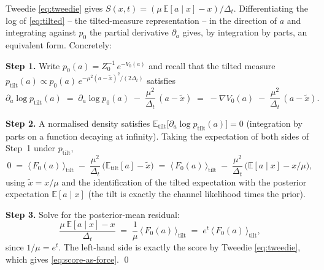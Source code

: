 \documentclass[11pt]{article}
\theoremstyle{definition}
\newcommand{\E}{\mathbb{E}}
\newcommand{\Detl}{\Delta_t}
\begin{document}
\begin{derivation}
Tweedie \eqref{eq:tweedie} gives
\(S(x, t) = (\mu\,\E[a \mid x] - x) / \Detl\). Differentiating the
log of \eqref{eq:tilted} -- the tilted-measure representation -- in
the direction of \(a\) and integrating against \(p_0\) the partial
derivative \(\partial_a\) gives, by integration by parts, an
equivalent form. Concretely:

\textbf{Step 1.} Write \(p_0(a) = Z_0^{-1}\, e^{-V_0(a)}\) and recall
that the tilted measure
\(p_{\mathrm{tilt}}(a) \propto p_0(a)\, e^{-\mu^2 (a - \widetilde x)^2
/ (2 \Detl)}\) satisfies
\begin{equation}
    \partial_a \log p_{\mathrm{tilt}}(a)
    \;=\; \partial_a \log p_0(a)
        \;-\; \frac{\mu^2}{\Detl}\, (a - \widetilde x)
    \;=\; - \nabla V_0(a) \;-\; \frac{\mu^2}{\Detl}\, (a - \widetilde x).
\end{equation}

\textbf{Step 2.} A normalised density satisfies
\(\E_{\mathrm{tilt}}\!\bigl[\partial_a \log p_{\mathrm{tilt}}(a)\bigr] = 0\)
(integration by parts on a function decaying at infinity). Taking the
expectation of both sides of Step~1 under \(p_{\mathrm{tilt}}\),
\begin{equation}
    0 \;=\;
    \bigl\langle\, F_0(a) \,\bigr\rangle_{\!\text{tilt}}
    \;-\;
    \frac{\mu^2}{\Detl}\,
        \bigl(\E_{\mathrm{tilt}}[a] - \widetilde x\bigr)
    \;=\;
    \bigl\langle\, F_0(a) \,\bigr\rangle_{\!\text{tilt}}
    \;-\;
    \frac{\mu^2}{\Detl}\,
        \bigl(\E[a \mid x] - x/\mu\bigr),
\end{equation}
using \(\widetilde x = x / \mu\) and the identification of the tilted
expectation with the posterior expectation
\(\E[a \mid x]\) (the tilt is exactly the channel likelihood times
the prior).

\textbf{Step 3.} Solve for the posterior-mean residual:
\begin{equation}
    \frac{\mu\,\E[a \mid x] - x}{\Detl}
    \;=\;
    \frac{1}{\mu}\,
    \bigl\langle\, F_0(a) \,\bigr\rangle_{\!\text{tilt}}
    \;=\; e^{t}\,
    \bigl\langle\, F_0(a) \,\bigr\rangle_{\!\text{tilt}},
\end{equation}
since \(1/\mu = e^t\). The left-hand side is exactly the score by
Tweedie \eqref{eq:tweedie}, which gives \eqref{eq:score-as-force}.
\qed
\end{derivation}
\end{document}

